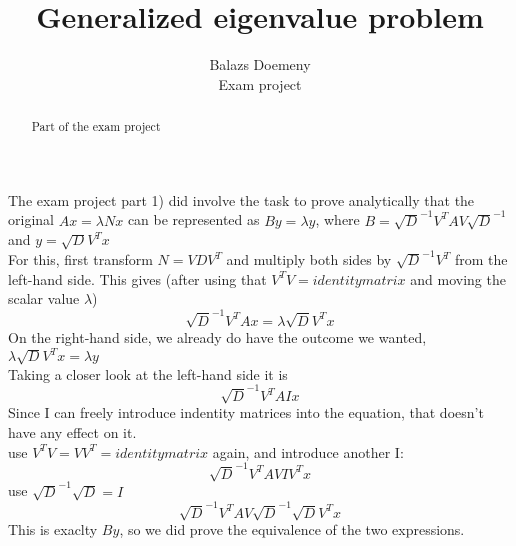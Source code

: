 \documentclass{article}
\begin{document}
\title{Generalized eigenvalue problem}
\author{Balazs Doemeny \\ Exam project}
\date{}
\maketitle

\begin{abstract}
\centering
Part of the exam project
\end{abstract}


The exam project part 1) did involve the task to prove analytically that the original $Ax=\lambda Nx$ can be represented as $By=\lambda y$, where $B=  \sqrt{D}^{-1} V^T A V \sqrt{D}^{-1} $ and $ y=\sqrt{D} V^T x $
\\
For this, first transform $N=VDV^T$ and multiply both sides by $\sqrt{D}^{-1} V^T$ from the left-hand side. This gives (after using that $V^TV= identity matrix$ and moving the scalar value $\lambda$)
$$\sqrt{D}^{-1} V^T A x =\lambda \sqrt{D} V^T x $$
On the right-hand side, we already do have the outcome we wanted, $\lambda \sqrt{D} V^T x = \lambda y$
\\
Taking a closer look at the left-hand side it is $$ \sqrt{D}^{-1} V^T A I x $$ Since I can freely introduce indentity matrices into the equation, that doesn't have any effect on it.
\\
use $V^TV=VV^T= identity matrix$ again, and introduce another I:  $$ \sqrt{D}^{-1} V^T A V I V^T x $$
use $\sqrt{D}^{-1} \sqrt{D} = I$
$$ \sqrt{D}^{-1} V^T A V \sqrt{D}^{-1} \sqrt{D} V^T x $$
This is exaclty $By$, so we did prove the equivalence of the two expressions.
\end{document}
